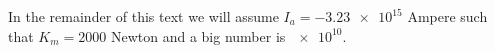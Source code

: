  In the remainder of this text we will assume $I_a = \num{-3.23e15}$ Ampere such that $K_m = \num{2000}$ Newton and a big number is $\num{e10}$.
